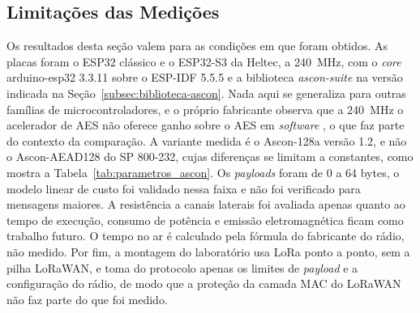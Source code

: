 \subsection{Limitações das Medições}
\label{subsec:limitacoes_ascon}

Os resultados desta seção valem para as condições em que foram obtidos. As placas foram o ESP32 clássico e o ESP32-S3 da Heltec, a 240~MHz, com o \textit{core} arduino-esp32 3.3.11 sobre o ESP-IDF 5.5.5 e a biblioteca \textit{ascon-suite} na versão indicada na Seção~\ref{subsec:biblioteca-ascon}. Nada aqui se generaliza para outras famílias de microcontroladores, e o próprio fabricante observa que a 240~MHz o acelerador de AES não oferece ganho sobre o AES em \textit{software} \cite{espressif2026idf}, o que faz parte do contexto da comparação. A variante medida é o Ascon-128a versão 1.2, e não o Ascon-AEAD128 do SP 800-232, cujas diferenças se limitam a constantes, como mostra a Tabela~\ref{tab:parametros_ascon}. Os \textit{payloads} foram de 0 a 64 bytes, o modelo linear de custo foi validado nessa faixa e não foi verificado para mensagens maiores. A resistência a canais laterais foi avaliada apenas quanto ao tempo de execução, consumo de potência e emissão eletromagnética ficam como trabalho futuro. O tempo no ar é calculado pela fórmula do fabricante do rádio, não medido. Por fim, a montagem do laboratório usa LoRa ponto a ponto, sem a pilha LoRaWAN, e toma do protocolo apenas os limites de \textit{payload} e a configuração do rádio, de modo que a proteção da camada MAC do LoRaWAN não faz parte do que foi medido.
